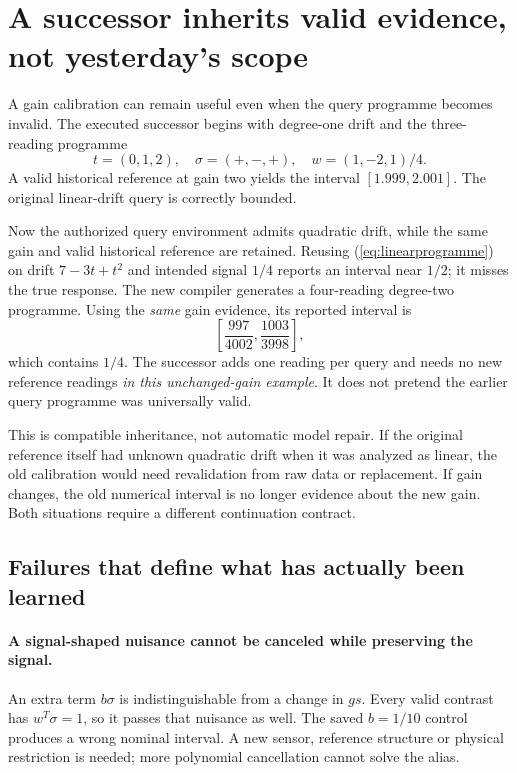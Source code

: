 \documentclass[11pt,letterpaper]{article}
\theoremstyle{definition}\newtheorem{definition}[theorem]{Definition}
\theoremstyle{remark}\newtheorem{remark}[theorem]{Remark}
\begin{document}
\section{A successor inherits valid evidence, not yesterday's scope}
\label{sec:successor}
A gain calibration can remain useful even when the query programme becomes invalid. The executed successor begins with degree-one drift and the three-reading programme
\begin{equation}
 t=(0,1,2),\quad\sigma=(+,-,+),\quad w=(1,-2,1)/4.
 \label{eq:linearprogramme}
\end{equation}
A valid historical reference at gain two yields the interval $[1.999,2.001]$. The original linear-drift query is correctly bounded.

Now the authorized query environment admits quadratic drift, while the same gain and valid historical reference are retained. Reusing (\ref{eq:linearprogramme}) on drift $7-3t+t^2$ and intended signal $1/4$ reports an interval near $1/2$; it misses the true response. The new compiler generates a four-reading degree-two programme. Using the \emph{same} gain evidence, its reported interval is
\begin{equation}
 \left[\frac{997}{4002},\frac{1003}{3998}\right],
 \label{eq:successorinterval}
\end{equation}
which contains $1/4$. The successor adds one reading per query and needs no new reference readings \emph{in this unchanged-gain example}. It does not pretend the earlier query programme was universally valid.

This is compatible inheritance, not automatic model repair. If the original reference itself had unknown quadratic drift when it was analyzed as linear, the old calibration would need revalidation from raw data or replacement. If gain changes, the old numerical interval is no longer evidence about the new gain. Both situations require a different continuation contract.

\subsection{Failures that define what has actually been learned}
\paragraph{A signal-shaped nuisance cannot be canceled while preserving the signal.}
An extra term $b\sigma$ is indistinguishable from a change in $gs$. Every valid contrast has $w^T\sigma=1$, so it passes that nuisance as well. The saved $b=1/10$ control produces a wrong nominal interval. A new sensor, reference structure or physical restriction is needed; more polynomial cancellation cannot solve the alias.
\end{document}
